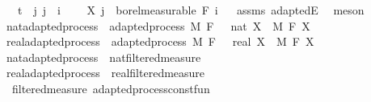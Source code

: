 \begin{isabellebody}
\ \ \ {\isachardoublequoteopen}t\ {\isasymle}\ j{\isachardoublequoteclose}\ {\isachardoublequoteopen}j\ {\isasymle}\ i{\isachardoublequoteclose}\ \isanewline
\ \ \ {\isachardoublequoteopen}X\ j\ {\isasymin}\ borel{\isacharunderscore}{\kern0pt}measurable\ {\isacharparenleft}{\kern0pt}F\ i{\isacharparenright}{\kern0pt}{\isachardoublequoteclose}%
\isadelimproof
\ %
\endisadelimproof
%
\isatagproof
{}\isamarkupfalse%
\ assms\ adaptedE\ \isamarkupfalse%
\ meson%
\endisatagproof
{\isafoldproof}%
%
\isadelimproof
%
\endisadelimproof
\isanewline
\isanewline
{}\isamarkupfalse%
\isanewline
\isanewline
{}\isamarkupfalse%
\ nat{\isacharunderscore}{\kern0pt}adapted{\isacharunderscore}{\kern0pt}process\ {\isacharequal}{\kern0pt}\ adapted{\isacharunderscore}{\kern0pt}process\ M\ F\ {\isachardoublequoteopen}{}\ {\isacharcolon}{\kern0pt}{\isacharcolon}{\kern0pt}\ nat{\isachardoublequoteclose}\ X\ \ M\ F\ X\isanewline
{}\isamarkupfalse%
\ real{\isacharunderscore}{\kern0pt}adapted{\isacharunderscore}{\kern0pt}process\ {\isacharequal}{\kern0pt}\ adapted{\isacharunderscore}{\kern0pt}process\ M\ F\ {\isachardoublequoteopen}{}\ {\isacharcolon}{\kern0pt}{\isacharcolon}{\kern0pt}\ real{\isachardoublequoteclose}\ X\ \ M\ F\ X\isanewline
\isanewline
{}\isamarkupfalse%
\ nat{\isacharunderscore}{\kern0pt}adapted{\isacharunderscore}{\kern0pt}process\ {\isasymsubseteq}\ nat{\isacharunderscore}{\kern0pt}filtered{\isacharunderscore}{\kern0pt}measure%
\isadelimproof
\ %
\endisadelimproof
%
\isatagproof
\isacommand{{\isachardot}{\kern0pt}{\isachardot}{\kern0pt}}\isamarkupfalse%
%
\endisatagproof
{\isafoldproof}%
%
\isadelimproof
%
\endisadelimproof
\isanewline
{}\isamarkupfalse%
\ real{\isacharunderscore}{\kern0pt}adapted{\isacharunderscore}{\kern0pt}process\ {\isasymsubseteq}\ real{\isacharunderscore}{\kern0pt}filtered{\isacharunderscore}{\kern0pt}measure%
\isadelimproof
\ %
\endisadelimproof
%
\isatagproof
\isacommand{{\isachardot}{\kern0pt}{\isachardot}{\kern0pt}}\isamarkupfalse%
%
\endisatagproof
{\isafoldproof}%
%
\isadelimproof
%
\endisadelimproof
\isanewline
\isanewline
{}\isamarkupfalse%
\ {\isacharparenleft}{\kern0pt}\ filtered{\isacharunderscore}{\kern0pt}measure{\isacharparenright}{\kern0pt}\ adapted{\isacharunderscore}{\kern0pt}process{\isacharunderscore}{\kern0pt}const{\isacharunderscore}{\kern0pt}fun{\isacharcolon}{\kern0pt}\isanewline

\end{isabellebody}
